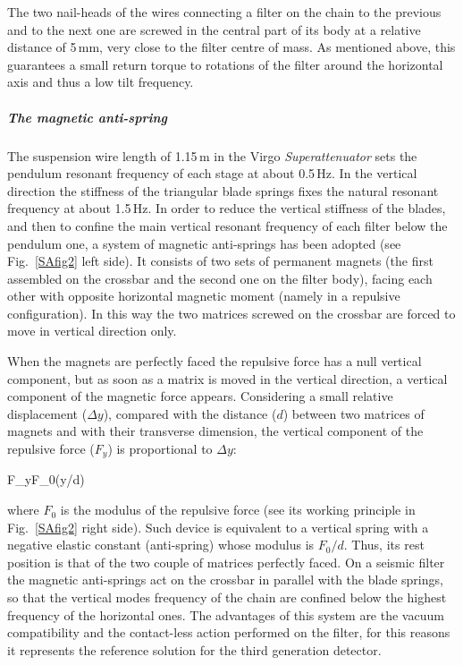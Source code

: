 The two nail-heads of the wires connecting a filter on the chain to the previous and to the next one are screwed in the central part of its body at a relative distance of 5\,mm, very close to the filter centre of mass. As mentioned above, this guarantees a small return torque to rotations of the filter around the horizontal axis and thus a low tilt frequency.

\subparagraph{The magnetic anti-spring}
The suspension wire length of 1.15\,m in the Virgo \emph{Superattenuator} sets the pendulum resonant frequency of each stage at about 0.5\,Hz. In the vertical direction the stiffness of the triangular blade springs fixes the natural resonant frequency at about 1.5\,Hz. In order to reduce the vertical stiffness of the blades, and then to confine the main vertical resonant frequency of each filter below the pendulum one, a system of magnetic anti-springs \cite{Beccaria1997,Braccini1993} has been adopted (see Fig.~\ref{SAfig2} left side). It consists of two sets of permanent magnets (the first assembled on the crossbar and the second one on the filter body), facing each other with opposite horizontal magnetic moment (namely in a repulsive configuration). In this way the two matrices screwed on the crossbar are forced to move in vertical direction only. 

When the magnets are perfectly faced the repulsive force has a null vertical component, but as soon as a matrix is moved in the vertical direction, a vertical component of the magnetic force appears. Considering a small relative displacement ($\Delta{y}$), compared with the distance ($d$) between two matrices of magnets and with their transverse dimension, the vertical component of the repulsive force ($F_y$) is proportional to $\Delta{y}$:

\beq
F_{y}\approx F_{0}\cdot (\Delta y/d)
\label{mag}
\eeq

where $F_0$ is the modulus of the repulsive force (see its working principle in Fig.~\ref{SAfig2} right side). Such device is equivalent to a vertical spring with a negative elastic constant (anti-spring) whose modulus is $F_0/d$. Thus, its rest position is that of  the two couple of matrices perfectly faced. On a seismic filter the magnetic anti-springs act on the crossbar in parallel with the blade springs, so that the vertical modes frequency of the chain are confined below the highest frequency of the horizontal ones. 
The advantages of this system are the vacuum compatibility and the contact-less
action performed on the filter, for this reasons it represents the reference solution for the third generation detector.

